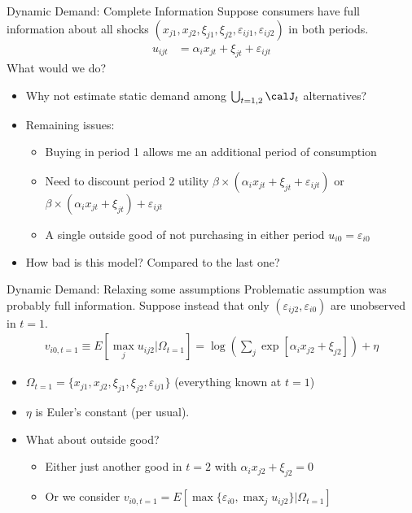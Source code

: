 \begin{frame}{Dynamic Demand: Complete Information}
Suppose consumers have full information about all shocks $(x_{j1},x_{j2},\xi_{j1},\xi_{j2},\varepsilon_{ij1},\varepsilon_{ij2})$ in both periods. 
\begin{align*}
u_{ijt} &=   \alpha_i x_{jt}  +  \xi_{jt} + \varepsilon_{ijt}
\end{align*}
What would we do?
\begin{itemize}
\item Why not estimate static demand among $\bigcup_{t=1,2}  \calJ_t $ alternatives?
\item Remaining issues:
\begin{itemize}
\item Buying in period 1 allows me an additional period of consumption
\item Need to discount period 2 utility $\beta \times ( \alpha_i x_{jt}  +  \xi_{jt} + \varepsilon_{ijt})$ or $\beta \times ( \alpha_i x_{jt}  +  \xi_{jt} )+\varepsilon_{ijt}$
\item A single outside good of not purchasing in either period $ u_{i0} =  \varepsilon_{i0} $
\end{itemize}
\item How bad is this model? Compared to the last one?
\end{itemize}
\end{frame}

\begin{frame}{Dynamic Demand: Relaxing some assumptions}
Problematic assumption was probably full information. Suppose instead that only $(\varepsilon_{ij2},\varepsilon_{i0})$ are \alert{unobserved} in $t=1$. 
\begin{align*}
v_{i0,t=1} \equiv E [\max_j u_{ij2}  | \Omega_{t=1}] = \log \left( \sum_j \exp [ \alpha_i x_{j2}  +  \xi_{j2} ] \right) + \eta
\end{align*}
\begin{itemize}
\item $\Omega_{t=1}= \{x_{j1},x_{j2},\xi_{j1},\xi_{j2},\varepsilon_{ij1}\}$ (everything known at $t=1$) 
\item $\eta$ is Euler's constant (per usual).
\item What about outside good?
\begin{itemize}
\item Either just another good in $t=2$ with $\alpha_i x_{j2}+ \xi_{j2} = 0$
\item Or we consider $v_{i0,t=1}=E [\max \{ \varepsilon_{i0}, \max_j u_{ij2} \}  | \Omega_{t=1}]$
\end{itemize}
\end{itemize}
\end{frame}


